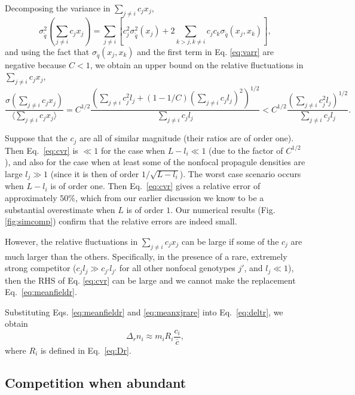 \documentclass[11pt]{article}
\begin{document}
Decomposing the variance in $\sum_{j\neq i} c_j x_j$,
\begin{equation}
\sigma_{\tilde{q}}^2(\sum_{j\neq i} c_j x_j)=\sum_{j\neq i}\left[c_j^2\sigma_{\tilde{q}}^2(x_j)+2\sum_{k>j, k\neq i}c_j c_k\sigma_{\tilde{q}}(x_j,x_k)\right],\label{eq:vartotr}
\end{equation}
and using the fact that $\sigma_{\tilde{q}}(x_j,x_k)$ and the first term in Eq. \eqref{eq:varr} are negative because $C<1$, we obtain an upper bound on the relative fluctuations in $\sum_{j\neq i} c_j x_j$, 
\begin{equation}
\frac{\sigma(\sum_{j\neq i} c_j x_j)}{\langle\sum_{j\neq i} c_j x_j\rangle}=C^{1/2}\frac{\left(\sum_{j\neq i}c_j^2 l_j+(1-1/C)\left(\sum_{j\neq i}c_j l_j\right)^2 \right)^{1/2}}{\sum_{j\neq i}c_j l_j}<C^{1/2}\frac{\left(\sum_{j\neq i}c_j^2 l_j\right)^{1/2}}{\sum_{j\neq i}c_j l_j}. \label{eq:cvr}
\end{equation}

Suppose that the $c_j$ are all of similar magnitude (their ratios are of order one). Then Eq.~\eqref{eq:cvr} is $\ll 1$ for the case when $L-l_i \ll 1$ (due to the factor of $C^{1/2}$), and also for the case when at least some of the nonfocal propagule densities are large $l_j\gg 1$ (since it is then of order $1/\sqrt{L-l_i}$). The worst case scenario occurs when $L-l_i$ is of order one. Then Eq.~\eqref{eq:cvr} gives a relative error of approximately $50\%$, which from our earlier discussion we know to be a substantial overestimate when $L$ is of order $1$. Our numerical results (Fig. \ref{fig:simcomp}) confirm that the relative errors are indeed small.

However, the relative fluctuations in $\sum_{j\neq i} c_j x_j$ can be large if some of the $c_j$ are much larger than the others. Specifically, in the presence of a rare, extremely strong competitor ($c_j l_j\gg c_{j'} l_{j'}$ for all other nonfocal genotypes $j'$, and $l_j\ll 1$), then the RHS of Eq. \eqref{eq:cvr} can be large and we cannot make the replacement Eq.~\eqref{eq:meanfieldr}. 

Substituting Eqs. \eqref{eq:meanfieldr} and \eqref{eq:meanxjrare} into Eq.~\eqref{eq:deltr}, we obtain
\begin{equation}
\Delta_r n_i\approx m_i R_i\frac{c_i}{\overline{c}}, \label{eq:deltrfinal}
\end{equation}
where $R_i$ is defined in Eq.~\eqref{eq:Dr}.

\subsection*{Competition when abundant}
\end{document}
